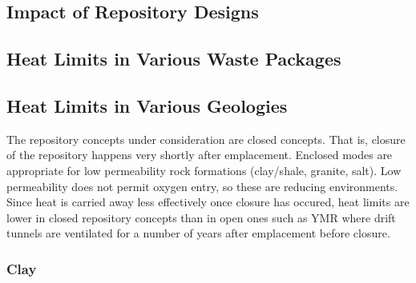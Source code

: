 \subsection{Impact of Repository Designs}

\subsection{Heat Limits in Various Waste Packages} 




\subsection{Heat Limits in Various Geologies}





The repository concepts under consideration are closed concepts. That is, 
closure of the repository happens very shortly after emplacement.
Enclosed modes are appropriate for low permeability rock formations (clay/shale, 
granite, salt). Low permeability does not permit oxygen entry, so these are
reducing environments. Since heat is carried away less effectively once closure 
has occured, heat limits are lower in  closed repository concepts than in open 
ones such as \gls{YMR} where drift tunnels are ventilated for a number of years
after emplacement before closure.

\subsubsection{Clay} 

